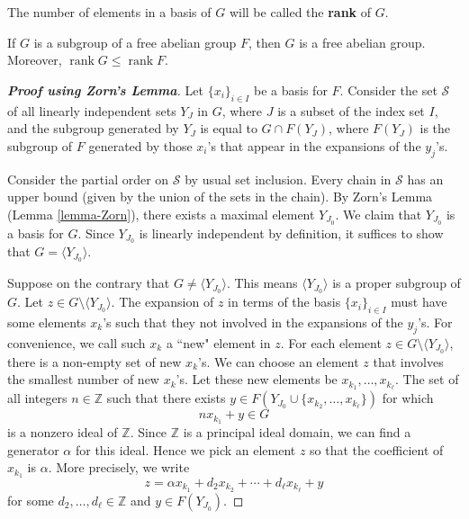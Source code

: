 \begin{definition}
	The number of elements in a basis of $G$ will be called
	the \textbf{rank} of $G$.
\end{definition}
\begin{theorem}  \label{thm-free-abelian-subgrp}
If $G$ is a subgroup of a free abelian group $F$, then $G$ is a free abelian group. Moreover, $\operatorname{rank} G \leq \operatorname{rank} F$.
\end{theorem}
\begin{proof}[\textbf{Proof using Zorn's Lemma}]
	Let $\{x_i\}_{i \in I}$ be a basis for $F$. Consider the set $\mathcal{S}$ of all linearly independent sets $Y_J$ in $G$, where $J$ is a subset of the index set $I$, and  the subgroup  generated by $Y_J$ is equal to $G \cap F(Y_J)$, where $F(Y_J)$ is the subgroup of $F$ generated by those $x_i$'s that appear in the expansions of the $y_j$'s.
	
	Consider the partial order on $\mathcal{S}$ by usual set inclusion. Every chain in $\mathcal{S}$ has an upper bound (given by the union of the sets in the chain). By Zorn's Lemma (Lemma \ref{lemma-Zorn}), there exists a maximal element $Y_{J_0}$.  We claim that $Y_{J_0}$ is a basis for $G$. Since $Y_{J_0}$ is linearly independent by definition, it suffices to show that $G = \langle Y_{J_0}\rangle$.
	
	Suppose on the contrary that $G \neq  \langle Y_{J_0}\rangle$. This means $\langle Y_{J_0}\rangle$ is a proper subgroup of $G$. Let $z \in G \setminus \langle Y_{J_0}\rangle$. The expansion of $z$ in terms of the basis $\{x_i\}_{i\in I}$ must have some elements $x_k$'s such that they not involved in the expansions of the $y_j$'s. For convenience, we call such $x_k$ a ``new" element in $z$. For each element $z\in G \setminus \langle Y_{J_0}\rangle$, there is a non-empty set of new  $x_k$'s. We can choose an element $z$ that involves the smallest number of new $x_k$'s. Let these new elements be $x_{k_1},\dots, x_{k_\ell}$. The set of all integers $n\in\mathbb{Z}$ such that there exists $y \in F(Y_{J_0}\cup \{x_{k_2},\dots, x_{k_\ell}\})$ for which $$nx_{k_1} + y\in G$$
	is a nonzero ideal of $\mathbb{Z}$. Since $\mathbb{Z}$ is a principal ideal domain, we can find a generator $\alpha$ for this ideal. Hence we pick an element $z$ so that the coefficient of $x_{k_1}$ is $\alpha$. More precisely, we write
	\begin{equation*}
		z = \alpha x_{k_1} + d_2 x_{k_2} + \cdots + d_\ell x_{k_{\ell}} + y
	\end{equation*}
	for some $d_2,\dots, d_\ell\in \mathbb{Z}$ and $y\in F(Y_{J_0})$.
	

\end{proof}
